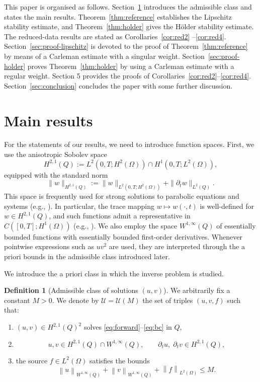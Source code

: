 \documentclass[12pt]{amsart}
\theoremstyle{plain}
\theoremstyle{definition}
\newtheorem{definition}{Definition}[section]
\theoremstyle{remark}
\newcommand{\p}{\partial}
\newcommand{\norm}[1]{\left\lVert#1\right\rVert}
\newcommand{\Om}{\Omega}
\begin{document}
This paper is organised as follows.
Section~\ref{sec:results} introduces the admissible class and states the main results.
Theorem~\ref{thm:reference} establishes the Lipschitz stability estimate, and
Theorem~\ref{thm:holder} gives the H\"older stability estimate.
The reduced-data results are stated as Corollaries~\ref{cor:red2}
--\ref{cor:red4}.
Section~\ref{sec:proof-lipschitz} is devoted to the proof of
Theorem~\ref{thm:reference} by means of a Carleman estimate with a singular weight.
Section~\ref{sec:proof-holder} proves Theorem~\ref{thm:holder} by using a
Carleman estimate with a regular weight.
Section 5 provides the proofs of Corollaries~\ref{cor:red2}--\ref{cor:red4}.
Section~\ref{sec:conclusion} concludes the paper with some further discussion.


\section{Main results}\label{sec:results}

For the statements of our results, we need to introduce function spaces.
First, we use the anisotropic Sobolev space
\[
H^{2,1}(Q)
:= L^2(0,T;H^2(\Omega))\cap H^1(0,T;L^2(\Omega)),
\]
equipped with the standard norm
\[
\|w\|_{H^{2,1}(Q)}
:=\|w\|_{L^2(0,T;H^2(\Omega))}+\|\partial_t w\|_{L^2(Q)}.
\]
This space is frequently used for strong solutions to parabolic equations and
systems (e.g., \cite{ladyzhenskaia1968linear,lunardi2012analytic}).
In particular, the trace mapping $w\mapsto w(\cdot,t)$ is well-defined for
$w\in H^{2,1}(Q)$, and such functions admit a representative in
$C([0,T];H^1(\Omega))$ (e.g., \cite{ladyzhenskaia1968linear}).
We also employ the space $W^{1,\infty}(Q)$ of essentially bounded functions 
with essentially bounded first-order derivatives.
Whenever pointwise expressions such as $uv^2$ are used, they are interpreted
through the a priori bounds in the admissible class introduced later.

We introduce the a priori class in which the inverse problem is studied.

\begin{definition}[Admissible class of solutions $(u,v)$]\label{def:U}
We arbitrarily fix a constant $M>0$.
We denote by $\mathcal U=\mathcal U(M)$ the set of triples $(u,v,f)$
such that:
\begin{enumerate}[label=(\roman*), leftmargin=2.5em]
\item $(u,v)\in H^{2,1}(Q)^2$ solves \eqref{eq:forward}--\eqref{eq:bc} in $Q$,
\item 
\[
u,v\in H^{2,1}(Q)\cap W^{1,\infty}(Q),\qquad
\p_t u,\;\p_t v\in H^{2,1}(Q),
\]
\item the source $f\in L^2(\Om)$ satisfies the bounds
\[
\norm{u}_{W^{1,\infty}(Q)}+\norm{v}_{W^{1,\infty}(Q)}
+\norm{f}_{L^2(\Om)}\le M.
\]
\end{enumerate}
\end{definition}
\end{document}
